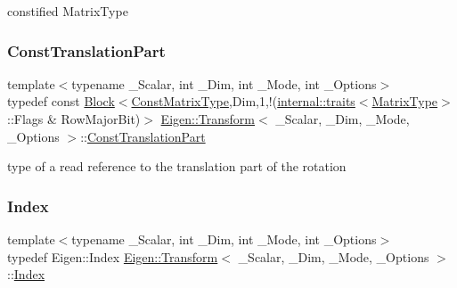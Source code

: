 constified Matrix\+Type \mbox{\label{class_eigen_1_1_transform_a3eab3259d3fac8106eb3139bc96ba852}} 
\subsubsection{\texorpdfstring{ConstTranslationPart}{ConstTranslationPart}}
{\footnotesize\ttfamily template$<$typename \+\_\+\+Scalar, int \+\_\+\+Dim, int \+\_\+\+Mode, int \+\_\+\+Options$>$ \\
typedef const \mbox{\hyperlink{class_eigen_1_1_block}{Block}}$<$\mbox{\hyperlink{class_eigen_1_1_transform_aed436d14b16bd862bac5367990085795}{Const\+Matrix\+Type}},Dim,1,!(\mbox{\hyperlink{struct_eigen_1_1internal_1_1traits}{internal\+::traits}}$<$\mbox{\hyperlink{class_eigen_1_1_transform_a30f72ba46abc2bb3c7fa919c1078fc9c}{Matrix\+Type}}$>$\+::Flags \& Row\+Major\+Bit)$>$ \mbox{\hyperlink{class_eigen_1_1_transform}{Eigen\+::\+Transform}}$<$ \+\_\+\+Scalar, \+\_\+\+Dim, \+\_\+\+Mode, \+\_\+\+Options $>$\+::\mbox{\hyperlink{class_eigen_1_1_transform_a3eab3259d3fac8106eb3139bc96ba852}{Const\+Translation\+Part}}}

type of a read reference to the translation part of the rotation \mbox{\label{class_eigen_1_1_transform_a49df3689ac2b736bcb564dec47d6486c}} 
\subsubsection{\texorpdfstring{Index}{Index}}
{\footnotesize\ttfamily template$<$typename \+\_\+\+Scalar, int \+\_\+\+Dim, int \+\_\+\+Mode, int \+\_\+\+Options$>$ \\
typedef Eigen\+::\+Index \mbox{\hyperlink{class_eigen_1_1_transform}{Eigen\+::\+Transform}}$<$ \+\_\+\+Scalar, \+\_\+\+Dim, \+\_\+\+Mode, \+\_\+\+Options $>$\+::\mbox{\hyperlink{class_eigen_1_1_transform_a49df3689ac2b736bcb564dec47d6486c}{Index}}}

